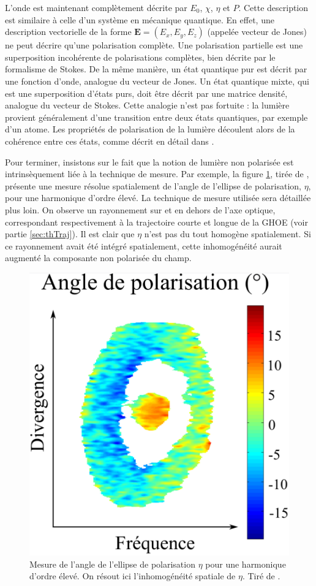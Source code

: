 L'onde est maintenant complètement décrite par $E_0$, $\chi$, $\eta$ et $P$. Cette description est similaire à celle d'un système en mécanique quantique. En effet, une description vectorielle de la forme $\bm{E}=(E_x,E_y,E_z)$ (appelée vecteur de Jones) ne peut décrire qu'une polarisation complète. Une polarisation partielle est une superposition incohérente de polarisations complètes, bien décrite par le formalisme de Stokes. De la même manière, un état quantique pur est décrit par une fonction d'onde, analogue du vecteur de Jones. Un état quantique mixte, qui est une superposition d'états purs, doit être décrit par une matrice densité, analogue du vecteur de Stokes. Cette analogie n'est pas fortuite : la lumière provient généralement d'une transition entre deux états quantiques, par exemple d'un atome. Les propriétés de polarisation de la lumière découlent alors de la cohérence entre ces états, comme décrit en détail dans . 

Pour terminer, insistons sur le fait que la notion de lumière non polarisée est intrinsèquement liée à la technique de mesure. Par exemple, la figure \ref{fig:angle_spatial}, tirée de , présente une mesure résolue spatialement de l'angle de l'ellipse de polarisation, $\eta$, pour une harmonique d'ordre élevé. La technique de mesure utilisée sera détaillée plus loin. On observe un rayonnement sur et en dehors de l'axe optique, correspondant respectivement à la trajectoire courte et longue de la GHOE (voir partie \ref{sec:thTraj}). Il est clair que $\eta$ n'est pas du tout homogène spatialement. Si ce rayonnement avait été intégré spatialement, cette inhomogénéité aurait augmenté la composante non polarisée du champ.

\begin{figure}[!ht]
\centering
\includegraphics[width=0.4\columnwidth]{Figures/Polar/angle_spatial.pdf}%
\caption{Mesure de l'angle de l'ellipse de polarisation $\eta$ pour une harmonique d'ordre élevé. On résout ici l'inhomogénéité spatiale de $\eta$. Tiré de .}%
\label{fig:angle_spatial}%
\end{figure}

